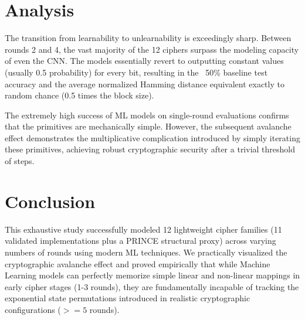 \documentclass[11pt,a4paper]{article}
\begin{document}
\section{Analysis}
The transition from learnability to unlearnability is exceedingly sharp. Between rounds 2 and 4, the vast majority of the 12 ciphers surpass the modeling capacity of even the CNN. The models essentially revert to outputting constant values (usually 0.5 probability) for every bit, resulting in the ~50\% baseline test accuracy and the average normalized Hamming distance equivalent exactly to random chance (0.5 times the block size).

The extremely high success of ML models on single-round evaluations confirms that the primitives are mechanically simple. However, the subsequent avalanche effect demonstrates the multiplicative complication introduced by simply iterating these primitives, achieving robust cryptographic security after a trivial threshold of steps.

\section{Conclusion}
This exhaustive study successfully modeled 12 lightweight cipher families (11 validated implementations plus a PRINCE structural proxy) across varying numbers of rounds using modern ML techniques. We practically visualized the cryptographic avalanche effect and proved empirically that while Machine Learning models can perfectly memorize simple linear and non-linear mappings in early cipher stages (1-3 rounds), they are fundamentally incapable of tracking the exponential state permutations introduced in realistic cryptographic configurations ($>=5$ rounds).
\end{document}
